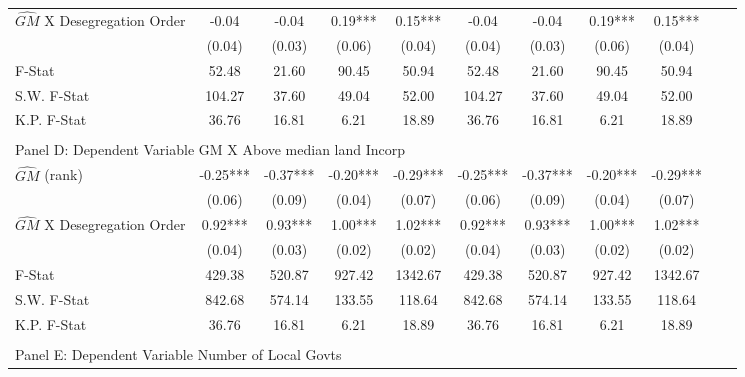 \begin{table}[htbp]
\begin{threeparttable}
\begin{tabular}{l*{10}{c}}
\addlinespace
$\hat{GM}$ X Desegregation Order&      -0.04   &      -0.04   &       0.19***&       0.15***&      -0.04   &      -0.04   &       0.19***&       0.15***\\
                &     (0.04)   &     (0.03)   &     (0.06)   &     (0.04)   &     (0.04)   &     (0.03)   &     (0.06)   &     (0.04)   \\
\midrule
F-Stat          &      52.48   &      21.60   &      90.45   &      50.94   &      52.48   &      21.60   &      90.45   &      50.94   \\
S.W. F-Stat     &     104.27   &      37.60   &      49.04   &      52.00   &     104.27   &      37.60   &      49.04   &      52.00   \\
K.P. F-Stat     &      36.76   &      16.81   &       6.21   &      18.89   &      36.76   &      16.81   &       6.21   &      18.89   \\
\cmidrule[\heavyrulewidth](lr){1-9} \\ \cmidrule[\heavyrulewidth](lr){1-9}
\multicolumn{8}{l}{Panel D: Dependent Variable GM X Above median land Incorp}\\
\cmidrule(lr){1-9}
$\hat{GM}$ (rank)&      -0.25***&      -0.37***&      -0.20***&      -0.29***&      -0.25***&      -0.37***&      -0.20***&      -0.29***\\
                &     (0.06)   &     (0.09)   &     (0.04)   &     (0.07)   &     (0.06)   &     (0.09)   &     (0.04)   &     (0.07)   \\
\addlinespace
$\hat{GM}$ X Desegregation Order&       0.92***&       0.93***&       1.00***&       1.02***&       0.92***&       0.93***&       1.00***&       1.02***\\
                &     (0.04)   &     (0.03)   &     (0.02)   &     (0.02)   &     (0.04)   &     (0.03)   &     (0.02)   &     (0.02)   \\
\midrule
F-Stat          &     429.38   &     520.87   &     927.42   &    1342.67   &     429.38   &     520.87   &     927.42   &    1342.67   \\
S.W. F-Stat     &     842.68   &     574.14   &     133.55   &     118.64   &     842.68   &     574.14   &     133.55   &     118.64   \\
K.P. F-Stat     &      36.76   &      16.81   &       6.21   &      18.89   &      36.76   &      16.81   &       6.21   &      18.89   \\
\cmidrule[\heavyrulewidth](lr){1-9} \\ \cmidrule[\heavyrulewidth](lr){1-9}
\multicolumn{8}{l}{Panel E: Dependent Variable Number of Local Govts}\\

\end{tabular}
\end{threeparttable}
\end{table}

